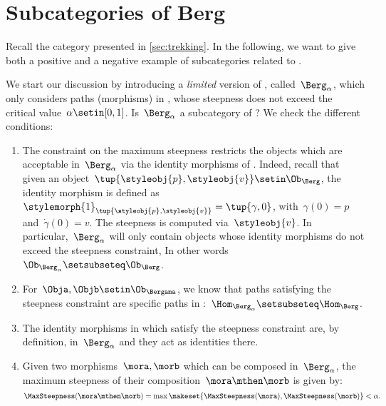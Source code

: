 
\section{Subcategories of Berg}
\label{sec:subcat_berg}

Recall the category \Berg presented in \cref{sec:trekking}.
In the following, we want to give both a positive and a negative example of subcategories related to \Berg.

We start our discussion by introducing a \emph{limited} version of \Berg, called~$\Berg_\alpha$, which only considers paths (morphisms) in \Berg, whose steepness does not exceed the critical value~$\alpha\setin [0,1]$.
Is~$\Berg_\alpha$ a subcategory of \Berg?
We check the different conditions:
\begin{enumerate}
    \item The constraint on the maximum steepness restricts the objects which are acceptable in~$\Berg_\alpha$ via the identity morphisms of \Berg.
          Indeed, recall that given an object~$\tup{\styleobj{p},\styleobj{v}}\setin \Ob_{\Berg}$, the identity morphism is defined as~$\stylemorph{1}_{\tup{\styleobj{p},\styleobj{v}}}=\tup{\gamma,0}$, with~$\gamma(0)=p$ and~$\dot{\gamma}(0)=v$.
          The steepness is computed via~$\styleobj{v}$.
          In particular,~$\Berg_\alpha$ will only contain objects whose identity morphisms do not exceed the steepness constraint, In other words~$\Ob_{\Berg_\alpha} \setsubseteq \Ob_\Berg$.
    \item For~$\Obja,\Objb\setin \Ob_{\Bergama}$, we know that paths satisfying the steepness constraint are specific paths in \Berg:~$\Hom_{\Berg_\alpha}\setsubseteq \Hom_{\Berg}$.
    \item The identity morphisms in \Berg which satisfy the steepness constraint are, by definition, in~$\Berg_\alpha$ and they act as identities there.
    \item Given two morphisms~$\mora,\morb$ which can be composed in~$\Berg_\alpha$, the maximum steepness of their composition~$\mora \mthen \morb$ is given by:
          \begin{equation*}
              \MaxSteepness(\mora \mthen \morb)
              =
              \max \makeset{
                  \MaxSteepness(\mora),
                  \MaxSteepness(\morb)
              }
              <
              \alpha.
          \end{equation*}
\end{enumerate}


